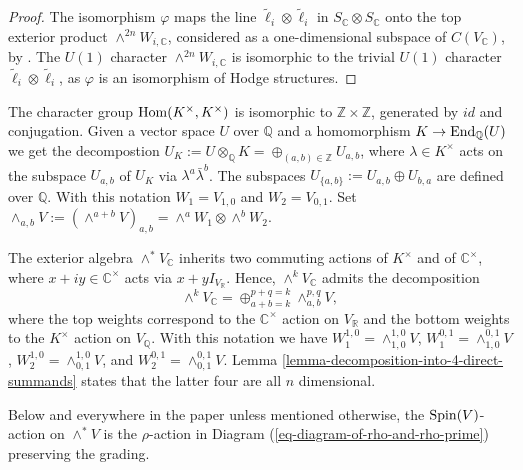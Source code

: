 \documentclass[12pt]{amsart}
\numberwithin{equation}{subsection}
\theoremstyle{plain}
\theoremstyle{definition}
\newcommand{\CC}{{\mathbb C}}
\newcommand{\QQ}{{\mathbb Q}}
\newcommand{\RR}{{\mathbb R}}
\newcommand{\ZZ}{{\mathbb Z}}
\newcommand{\Spin}{{\rm Spin}}
\newcommand{\Hom}{{\rm Hom}}
\newcommand{\End}{{\rm End}}
\begin{document}
\begin{proof}
The isomorphism $\varphi$ maps the line $\tilde{\ell}_i\otimes \tilde{\ell}_i$ in $S_\CC\otimes S_\CC$ onto 
the top exterior product $\wedge^{2n}W_{i,\CC}$, considered as a one-dimensional subspace of $C(V_\CC)$, by  \cite[III.3.2]{chevalley}.
The $U(1)$ character $\wedge^{2n}W_{i,\CC}$ is isomorphic to the trivial $U(1)$ character $\tilde{\ell}_i\otimes \tilde{\ell}_i$,
as $\varphi$ is an isomorphism of Hodge structures.
\end{proof}

The character group $\Hom(K^\times,K^\times)$ is isomorphic to $\ZZ\times\ZZ$, generated by $id$ and conjugation.
Given a vector space $U$ over $\QQ$ and a homomorphism $K\rightarrow \End_\QQ(U)$ 
we get the decompostion $U_K:=U\otimes_\QQ K=\oplus_{(a,b)\in \ZZ}U_{a,b}$, where $\lambda\in K^\times$ acts on the subspace $U_{a,b}$ of $U_K$ via $\lambda^a\bar{\lambda}^b$. 
The subspaces $U_{\{a,b\}}:=U_{a,b}\oplus U_{b,a}$ are defined over $\QQ$.
With this notation $W_1=V_{1,0}$ and $W_2=V_{0,1}$. Set $\wedge_{a,b}V:=(\wedge^{a+b}V)_{a,b}=\wedge^aW_1\otimes\wedge^bW_2.$

The exterior algebra $\wedge^*V_\CC$ 
inherits two commuting actions of $K^\times$ and of $\CC^\times$, where $x+iy\in \CC^\times$ acts via $x+yI_{V_\RR}$. Hence, 
$\wedge^kV_\CC$ admits the decomposition
\[
\wedge^kV_\CC = \oplus^{p+q=k}_{a+b=k} \wedge^{p,q}_{a,b}V,
\]
where the top weights correspond to the $\CC^\times$ action on $V_\RR$ and the bottom weights to the $K^\times$ 
action on $V_\QQ$. With this notation we have $W^{1,0}_1=\wedge^{1,0}_{1,0}V$, $W^{0,1}_1=\wedge^{0,1}_{1,0}V$, $W^{1,0}_2=\wedge^{1,0}_{0,1}V$, and $W^{0,1}_2=\wedge^{0,1}_{0,1}V$. 
Lemma \ref{lemma-decomposition-into-4-direct-summands} states that the latter four are all $n$ dimensional. 

Below and everywhere in the paper unless mentioned otherwise, the $\Spin(V)$-action on $\wedge^*V$ is the $\rho$-action in Diagram (\ref{eq-diagram-of-rho-and-rho-prime})
preserving the grading.
\end{document}
